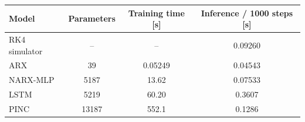 \begin{tabular}{lccc}
\toprule
Model & Parameters & Training time [s] & Inference / 1000 steps [s] \\
\midrule
RK4 simulator & -- & -- & 0.09260 \\
ARX & 39 & 0.05249 & 0.04543 \\
NARX-MLP & 5187 & 13.62 & 0.07533 \\
LSTM & 5219 & 60.20 & 0.3607 \\
PINC & 13187 & 552.1 & 0.1286 \\
\bottomrule
\end{tabular}
